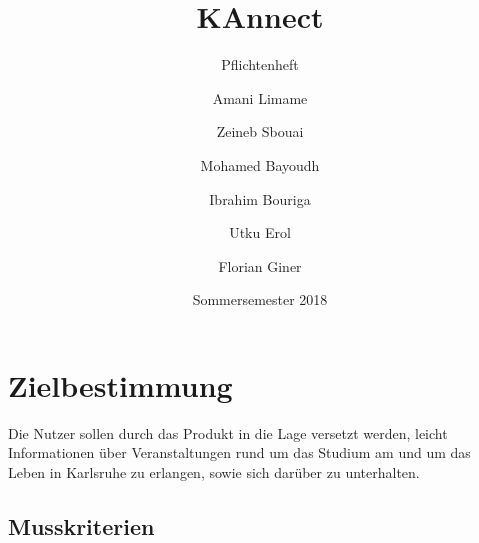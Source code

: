 \documentclass[parskip=full]{scrartcl}
\title{KAnnect}
\subtitle{Pflichtenheft}
\author{
	Amani Limame
	\and Zeineb Sbouai
	\and Mohamed Bayoudh
	\and Ibrahim Bouriga
	\and Utku Erol
	\and Florian Giner
}
\date{Sommersemester 2018}
\begin{document}
		\maketitle
		\newpage
		\tableofcontents
		\newpage
		\setlength{\parindent}{0em}
		\setlength{\parskip}{0.5em}
		
		\section{Zielbestimmung}
		Die Nutzer sollen durch das Produkt in die Lage versetzt werden, leicht Informationen über Veranstaltungen rund um das Studium am und um das Leben in Karlsruhe zu erlangen, sowie sich darüber zu unterhalten.
		
		\subsection{Musskriterien}
		
\end{document}
